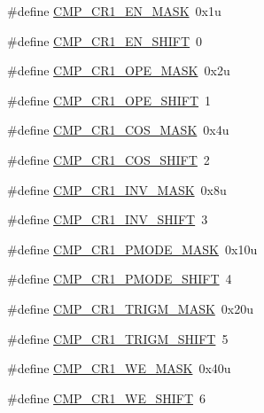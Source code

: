 \begin{DoxyCompactItemize}
\#define \hyperlink{group___c_m_p___register___masks_ga2492ad39a9661a1217cc26f20bd31ef2}{C\+M\+P\+\_\+\+C\+R1\+\_\+\+E\+N\+\_\+\+M\+A\+SK}~0x1u
\item 
\#define \hyperlink{group___c_m_p___register___masks_gacaacf0894bdf41eb49de1ae81075fa2b}{C\+M\+P\+\_\+\+C\+R1\+\_\+\+E\+N\+\_\+\+S\+H\+I\+FT}~0
\item 
\#define \hyperlink{group___c_m_p___register___masks_gaaad42787753465406dd5006f228049dd}{C\+M\+P\+\_\+\+C\+R1\+\_\+\+O\+P\+E\+\_\+\+M\+A\+SK}~0x2u
\item 
\#define \hyperlink{group___c_m_p___register___masks_ga5c273c5f23e09e69a9589a285cbe2c24}{C\+M\+P\+\_\+\+C\+R1\+\_\+\+O\+P\+E\+\_\+\+S\+H\+I\+FT}~1
\item 
\#define \hyperlink{group___c_m_p___register___masks_gaf8b38740c4bddec386b2b7d674f5f0fc}{C\+M\+P\+\_\+\+C\+R1\+\_\+\+C\+O\+S\+\_\+\+M\+A\+SK}~0x4u
\item 
\#define \hyperlink{group___c_m_p___register___masks_gaaf826df5b4ff2069e2cb112f03c7b782}{C\+M\+P\+\_\+\+C\+R1\+\_\+\+C\+O\+S\+\_\+\+S\+H\+I\+FT}~2
\item 
\#define \hyperlink{group___c_m_p___register___masks_ga562c151a4679c2b50e20d6418dcc7d99}{C\+M\+P\+\_\+\+C\+R1\+\_\+\+I\+N\+V\+\_\+\+M\+A\+SK}~0x8u
\item 
\#define \hyperlink{group___c_m_p___register___masks_gae8bcf6f11eb6afb3967dc6e318b0c41f}{C\+M\+P\+\_\+\+C\+R1\+\_\+\+I\+N\+V\+\_\+\+S\+H\+I\+FT}~3
\item 
\#define \hyperlink{group___c_m_p___register___masks_ga09a2757123048a40e1694dd9454982ee}{C\+M\+P\+\_\+\+C\+R1\+\_\+\+P\+M\+O\+D\+E\+\_\+\+M\+A\+SK}~0x10u
\item 
\#define \hyperlink{group___c_m_p___register___masks_ga35cfe45cce5ed6925e522e3c4527054a}{C\+M\+P\+\_\+\+C\+R1\+\_\+\+P\+M\+O\+D\+E\+\_\+\+S\+H\+I\+FT}~4
\item 
\#define \hyperlink{group___c_m_p___register___masks_ga24b34c51bad9a20f0b0d47b89fdd864b}{C\+M\+P\+\_\+\+C\+R1\+\_\+\+T\+R\+I\+G\+M\+\_\+\+M\+A\+SK}~0x20u
\item 
\#define \hyperlink{group___c_m_p___register___masks_ga699c1c25ea54f378c1e6eece319bbca3}{C\+M\+P\+\_\+\+C\+R1\+\_\+\+T\+R\+I\+G\+M\+\_\+\+S\+H\+I\+FT}~5
\item 
\#define \hyperlink{group___c_m_p___register___masks_ga70bc3069a7e105b59d01d83b4d1714b1}{C\+M\+P\+\_\+\+C\+R1\+\_\+\+W\+E\+\_\+\+M\+A\+SK}~0x40u
\item 
\#define \hyperlink{group___c_m_p___register___masks_ga386bf7ca4f7eb8faa4ba8346620667f2}{C\+M\+P\+\_\+\+C\+R1\+\_\+\+W\+E\+\_\+\+S\+H\+I\+FT}~6

\end{DoxyCompactItemize}
